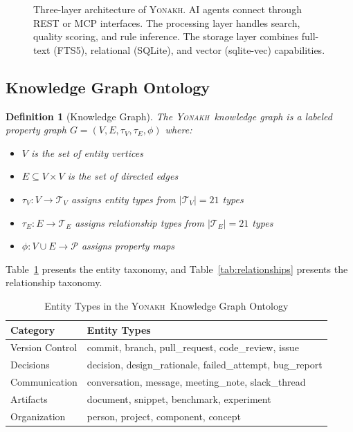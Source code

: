 \documentclass[10pt,journal,compsoc]{IEEEtran}
\newcommand{\yonakh}{\textsc{Yonakh}}
\newtheorem{definition}{Definition}
\begin{document}
\begin{figure}[t]
\caption{Three-layer architecture of \yonakh. AI agents connect through REST or MCP interfaces. The processing layer handles search, quality scoring, and rule inference. The storage layer combines full-text (FTS5), relational (SQLite), and vector (sqlite-vec) capabilities.}
\label{fig:architecture}
\end{figure}

\subsection{Knowledge Graph Ontology}

\begin{definition}[Knowledge Graph]
The \yonakh\ knowledge graph is a labeled property graph $G = (V, E, \tau_V, \tau_E, \phi)$ where:
\begin{itemize}
\item $V$ is the set of entity vertices
\item $E \subseteq V \times V$ is the set of directed edges
\item $\tau_V: V \to \mathcal{T}_V$ assigns entity types from $|\mathcal{T}_V| = 21$ types
\item $\tau_E: E \to \mathcal{T}_E$ assigns relationship types from $|\mathcal{T}_E| = 21$ types
\item $\phi: V \cup E \to \mathcal{P}$ assigns property maps
\end{itemize}
\end{definition}

Table~\ref{tab:entities} presents the entity taxonomy, and Table~\ref{tab:relationships} presents the relationship taxonomy.

\begin{table}[t]
\caption{Entity Types in the \yonakh\ Knowledge Graph Ontology}
\label{tab:entities}
\centering
\small
\renewcommand{\arraystretch}{1.3}
\begin{tabular}{@{}p{} p{}@{}}
\toprule
\textbf{Category} & \textbf{Entity Types} \\
\midrule
Version Control & commit, branch, pull\_request, code\_review, issue \\
Decisions & decision, design\_rationale, failed\_attempt, bug\_report \\
Communication & conversation, message, meeting\_note, slack\_thread \\
Artifacts & document, snippet, benchmark, experiment \\
Organization & person, project, component, concept \\
\bottomrule
\end{tabular}
\end{table}
\end{document}
